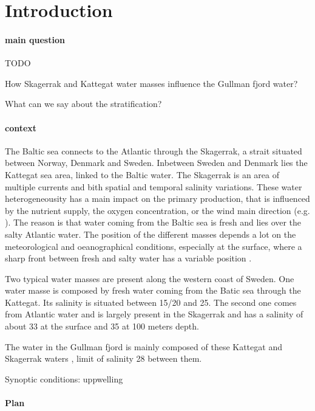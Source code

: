 \documentclass[12pt,a4paper]{article}
\begin{document}
\newpage

\section{\label{sec_intro}Introduction}

\paragraph{main question}

TODO

How Skagerrak and Kattegat water masses influence
the Gullman fjord water?

What can we say about the stratification?


\paragraph{context}

The Baltic sea connects to the Atlantic through the Skagerrak,
a strait situated between Norway, Denmark and Sweden.
Inbetween Sweden and Denmark lies the Kattegat sea area,
linked to the Baltic water.
The Skagerrak is an area of multiple currents and
bith spatial and temporal salinity variations.
These water heterogeneousity has a main impact on
the primary production, that is influenced by the nutrient
supply, the oxygen concentration, or the wind main direction (e.g.
\cite{lindhal1998,dahl1992,andersson1993}).
The reason is that water coming from the Baltic sea
is fresh and lies over the salty Atlantic water.
The position of the different masses depends a lot on
the meteorological and oeanographical conditions,
especially at the surface, where a sharp front
between fresh and salty water has a variable position
\citep{gustafsson1996}.


Two typical water masses are present along the western coast of Sweden.
One water masse is composed by fresh water coming from the Batic sea through the Kattegat.
Its salinity is situated between 15/20 and 25.
The second one comes from Atlantic water and is largely present in the Skagerrak
and has a salinity of about 33 at the surface and 35 at 100 meters depth.

The water in the Gullman fjord is mainly composed of these
Kattegat and Skagerrak waters \citep{arneborg2003}, limit of
salinity 28 between them.

Synoptic conditions: uppwelling

\paragraph{Plan}
\end{document}
